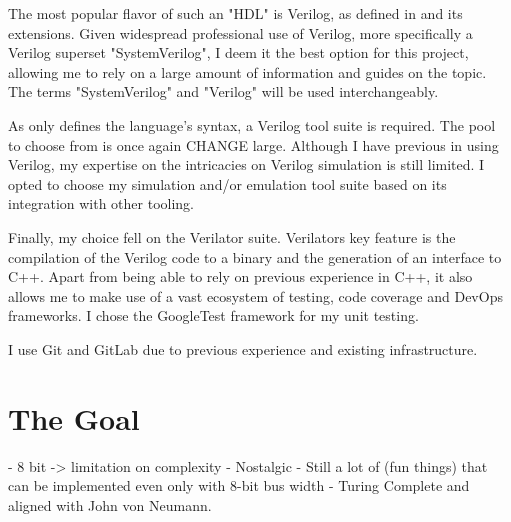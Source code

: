The most popular flavor of such an "HDL" is Verilog, as defined in \cite{10458102} and its extensions. Given widespread professional use of Verilog, more specifically a Verilog superset "SystemVerilog", I deem it the best option for this project, allowing me to rely on a large amount of information and guides on the topic. The terms "SystemVerilog" and "Verilog" will be used interchangeably. 

As \cite{10458102} only defines the language's syntax, a Verilog tool suite is required. The pool to choose from is once again CHANGE large. Although I have previous in using Verilog, my expertise on the intricacies on Verilog simulation is still limited. I opted to choose my simulation and/or emulation tool suite based on its integration with other tooling.

Finally, my choice fell on the Verilator suite. Verilators key feature is the compilation of the Verilog code to a binary and the 
generation of an interface to C++. Apart from being able to rely on previous experience in C++, it also allows me to make use of a vast ecosystem of testing, code coverage and DevOps frameworks. I chose the GoogleTest framework for my unit testing. 

I use Git and GitLab due to previous experience and existing infrastructure. 

  \section{The Goal}

- 8 bit -> limitation on complexity
- Nostalgic
- Still a lot of (fun things) that can be implemented even only with 8-bit bus width
- Turing Complete and aligned with John von Neumann.



